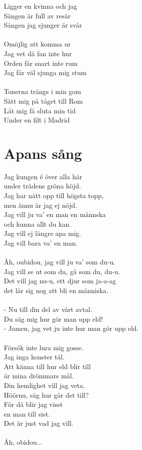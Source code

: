 Ligger en kvinna och jag\\
Sängen är full av resår\\
Sången jag sjunger är svår\\
\\
Omöjlig att komma ur\\
Jag vet då fan inte hur\\
Orden får snart inte rum\\
Jag får väl sjunga mig stum\\
\\
Tonerna trängs i min gom\\
Sätt mig på tåget till Rom\\
Låt mig få sluta min tid\\
Under en filt i Madrid

\newpage
\section{Apans sång}
Jag kungen é över alla här\\
under trädens gröna höjd.\\
Jag har nått opp till högsta topp,\\
men ännu är jag ej nöjd.\\
Jag vill ju va' en man en männska\\
och kunna allt du kan.\\
Jag vill ej längre apa mig.\\
Jag vill bara va' en man.\\
\\
Åh, oubidou, jag vill ju va' som du-u.\\
Jag vill se ut som du, gå som du, du-u.\\
Det vill jag nu-u, ett djur som ja-a-ag\\
det lär sig nog att bli en människa.\\
\\
- Nu till din del av vårt avtal.\\
Du säg mig hur gör man upp eld!\\
- Jamen, jag vet ju inte hur man gör upp eld.\\
\\
Försök inte lura mig gosse.\\
Jag inga konster tål.\\
Att känna till hur eld blir till\\
är mina drömmars mål.\\
Din hemlighet vill jag veta.\\
Höörnu, säg hur går det till?\\
För då blir jag visst\\
en man till sist.\\
Det är just vad jag vill.\\
\\
Åh, obidou...

